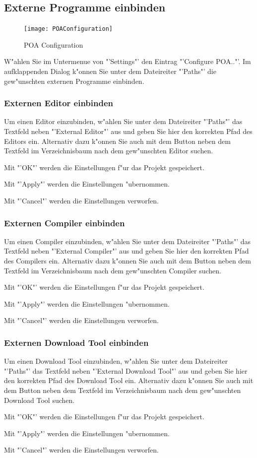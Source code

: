 \documentclass[a4paper,titlepage,12pt,ngerman]{scrbook}
\begin{document}
\subsection{Externe Programme einbinden}
\begin{figure}[htbp]
\begin{center}
\texttt{[image: POAConfiguration]}
\caption{POA Configuration}\label{test}
\end{center}
\end{figure}
W"ahlen Sie im Untermenue von "'Settings"' den Eintrag "'Configure POA.."'. Im aufklappenden Dialog k"onnen Sie unter dem Dateireiter "'Paths"' die gew"unschten externen Programme einbinden.
\subsubsection{Externen Editor einbinden}
Um einen Editor einzubinden, w"ahlen Sie unter dem Dateireiter "'Paths"' das Textfeld neben "'External Editor"' aus und geben Sie hier den korrekten Pfad des Editors ein. Alternativ dazu k"onnen Sie auch mit dem Button neben dem Textfeld im Verzeichnisbaum nach dem gew"unschten Editor suchen.\par
Mit "'OK"' werden die Einstellungen f"ur das Projekt gespeichert.\par
Mit "'Apply"' werden die Einstellungen "ubernommen.\par
Mit "'Cancel"' werden die Einstellungen verworfen.\par 

\subsubsection{Externen Compiler einbinden}
Um einen Compiler einzubinden, w"ahlen Sie unter dem Dateireiter "'Paths"' das Textfeld neben "'External Compiler"' aus und geben Sie hier den korrekten Pfad des Compilers ein. Alternativ dazu k"onnen Sie auch mit dem Button neben dem Textfeld im Verzeichnisbaum nach dem gew"unschten Compiler suchen.\par
Mit "'OK"' werden die Einstellungen f"ur das Projekt gespeichert.\par
Mit "'Apply"' werden die Einstellungen "ubernommen.\par
Mit "'Cancel"' werden die Einstellungen verworfen.\par 

\subsubsection{Externen Download Tool einbinden}
Um einen Download Tool einzubinden, w"ahlen Sie unter dem Dateireiter "'Paths"' das Textfeld neben "'External Download Tool"' aus und geben Sie hier den korrekten Pfad des Download Tool ein. Alternativ dazu k"onnen Sie auch mit dem Button neben dem Textfeld im Verzeichnisbaum nach dem gew"unschten Download Tool suchen. \par
Mit "'OK"' werden die Einstellungen f"ur das Projekt gespeichert.\par
Mit "'Apply"' werden die Einstellungen "ubernommen.\par
Mit "'Cancel"' werden die Einstellungen verworfen.\par 
\end{document}
